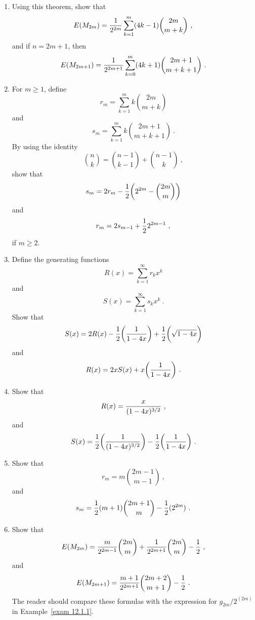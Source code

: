 \begin{LJSItem}
\begin{enumerate}

\item Using this theorem, show that
$$E(M_{2m}) = {1\over{2^{2m}}}\sum_{k = 1}^m (4k-1){2m \choose m+k}\ ,$$
and if $n = 2m+1$, then
$$E(M_{2m+1}) = {1\over {2^{2m+1}}} \sum_{k = 0}^m (4k+1){2m+1\choose m+k+1}\ .$$

\item
For $m \ge 1$, define 
$$r_m = \sum_{k = 1}^m k {2m\choose m+k}$$
and
$$s_m = \sum_{k = 1}^m k {2m+1\choose m+k+1}\ .$$
By using the identity
$${n\choose k} = {n-1\choose k-1} + {n-1\choose k}\ ,$$
show that
$$s_m = 2r_m - {1\over 2}\biggl(2^{2m} - {2m \choose m}\biggr)$$
and
$$r_m = 2s_{m-1} + {1\over 2}2^{2m-1}\ ,$$
if $m \ge 2$.

\item
Define the generating functions
$$R(x) = \sum_{k = 1}^\infty r_k x^k$$
and
$$S(x) = \sum_{k = 1}^\infty s_k x^k\ .$$
Show that
$$S(x) = 2 R(x) - {1\over 2}\biggl({1\over{1- 4x}}\biggr) + {1\over 2}\biggl(\sqrt{1-4x}\biggr)$$
and
$$R(x) = 2xS(x) + x\biggl({1\over{1-4x}}\biggr)\ .$$

\item
Show that
$$R(x) = {x\over{(1-4x)^{3/2}}}\ ,$$
and
$$S(x) = {1\over 2}\biggl({1\over{(1- 4x)^{3/2}}}\biggr) - 
{1\over 2}\biggl({1\over{1- 4x}}\biggr)\ .$$

\item
Show that
$$r_m = m{2m-1\choose m-1}\ ,$$
and
$$s_m = {1\over 2}(m+1){2m+1\choose m} - {1\over 2}(2^{2m})\ .$$

\item
Show that
$$E(M_{2m}) = {m\over{2^{2m-1}}}{2m\choose m} + {1\over{2^{2m+1}}}{2m\choose m} - {1\over 2}\ ,$$
and
$$E(M_{2m+1}) = {{m+1}\over{2^{2m+1}}}{2m+2\choose m+1} - {1\over 2}\ .$$
The reader should compare these formulas with the expression for \linebreak $g_{2m}/2^{(2m)}$ in
Example~\ref{exam 12.1.1}.
\end{enumerate}


\end{LJSItem}
